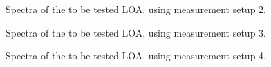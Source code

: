 \documentclass[12pt]{article}
\begin{document}
%
%
\begin{figure}[ht!]
\caption{Spectra of the to be tested LOA, using measurement setup 2.}
\label{fig:Measurement-Setup2}
\end{figure}
%
%
\begin{figure}[ht!]
\caption{Spectra of the to be tested LOA, using measurement setup 3.}
\label{fig:Measurement-Setup3}
\end{figure}
%
%
\begin{figure}[ht!]
\caption{Spectra of the to be tested LOA, using measurement setup 4.}
\label{fig:Measurement-Setup4}
\end{figure}
\end{document}
